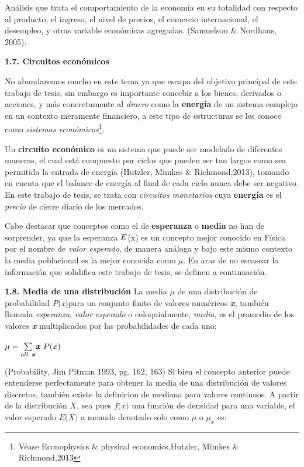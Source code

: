 Análisis que trata el comportamiento de la economía en su totalidad con respecto al producto, el ingreso, el nivel de precios, el comercio internacional, el desempleo, y otras variable económicas agregadas. (Samuelson \& Nordhaus, 2005).
\newline

{
\noindent
\Large  \textbf{1.7. Circuitos económicos} 
}

No abundaremos mucho en este tema ya que escapa del objetivo principal de este trabajo de tesis, sin embargo es importante concebir a los bienes, derivados o acciones, y más concretamente al \textit{dinero} como la \textbf{energía} de un sistema complejo en un contexto meramente financiero, a este tipo de estructuras se les conoce como \textit{sistemas económicos}\footnote{Véase Econophysics \& physical economics,Hutzler, Mimkes \& Richmond,2013 }. 
\newline

Un \textbf{circuito económico} es un sistema que puede ser modelado de diferentes maneras, el cual está compuesto por ciclos que pueden ser tan largos como sea permitida la entrada de energía (Hutzler, Mimkes \& Richmond,2013), tomando en cuenta que el balance de energía al final de cada ciclo nunca debe ser negativo. En este trabajo de tesis, se trata con \textit{circuitos monetarios} cuya \textbf{energía} es el \textit{precio} de cierre diario de los mercados.
\newline

Cabe destacar que conceptos como el de \textbf{esperanza} o  \textbf{media} no han de sorprender, ya que la esperanza $\boldmath{E}$(x) es un concepto mejor conocido en Física por el nombre de \textit{valor esperado}, de manera análoga y bajo este mismo contexto la media poblacional es la mejor conocida como $\mu$. En aras de no escasear la información que solidifica este trabajo de tesis, se definen a continuación.

{
\noindent
\Large  \textbf{1.8. Media de una distribución} 
}
\newline
La media $\mu$ de una distribución de probabilidad \textit{P}(\textit{x})para un conjunto finito de valores numéricos \textbf{\textit{x}}, también llamada \textit{esperanza}, \textit{valor esperado} o coloquialmente, \textit{media}, es el promedio de los valores \textbf{\textit{x}} multiplicados por las probabilidades de cada uno: 

\begin{center}
$\mu = \underset{all \hspace{0.15cm} \textbf{\textit{x}}}{\overset{}{\sum}} \textbf{\textit{x}} \hspace{0.11cm} P (x) $
\end{center}
(Probability, Jim Pitman 1993, pg. 162, 163)
\newpage
Si bien el concepto anterior puede entenderse perfectamente para obtener la media de una distribución de valores discretos, también existe la definicion de mediana para valores continuos. A partir de la distribución $\textit{X}$, sea pues $\textit{f(x)}$ una función de densidad para una variable, el valor esperado $\textit{E(X)}$ a menudo denotado solo como $\mu$ o $ \mu_x$ es:


